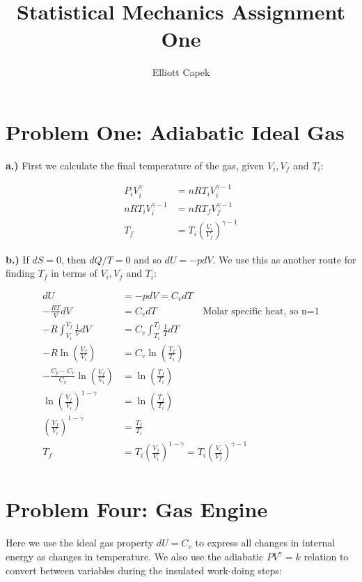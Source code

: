 \documentclass[10pt]{article} %
\title{Statistical Mechanics Assignment One}
\author{Elliott Capek}
\begin{document}
\maketitle{}

\section{Problem One: Adiabatic Ideal Gas}
\textbf{a.)}
First we calculate the final temperature of the gas, given $V_i, V_f$ and $T_i$:

\begin{align*}
  P_iV_i^\gamma &= nRT_iV_i^{\gamma-1}\\
  nRT_iV_i^{\gamma-1} &= nRT_fV_f^{\gamma-1}\\
  T_f &= T_i\left(\frac{V_i}{V_f}\right)^{\gamma-1}
\end{align*}

\textbf{b.)}
If $dS=0$, then $dQ/T=0$ and so $dU = -pdV$. We use this as another route for finding $T_f$ in
terms of $V_i, V_f$ and $T_i$:

\begin{align*}
  dU &= -pdV = C_vdT\\
  -\frac{RT}{V}dV &= C_vdT \hspace{2cm}\mbox{Molar specific heat, so n=1}\\
  -R\int_{V_i}^{V_f}\frac{1}{V}dV &= C_v\int_{T_i}^{T_f}\frac{1}{T}dT\\
  -R\ln\left(\frac{V_f}{V_i}\right) &= C_v\ln\left(\frac{T_f}{T_i}\right)\\
  -\frac{C_p-C_v}{C_v}\ln\left(\frac{V_f}{V_i}\right) &= \ln\left(\frac{T_f}{T_i}\right)\\
  \ln\left(\frac{V_f}{V_i}\right)^{1-\gamma} &= \ln\left(\frac{T_f}{T_i}\right)\\
  \left(\frac{V_f}{V_i}\right)^{1-\gamma} &= \frac{T_f}{T_i}\\
  T_f &= T_i\left(\frac{V_f}{V_i}\right)^{1-\gamma} = T_i\left(\frac{V_i}{V_f}\right)^{\gamma-1}\\
\end{align*}

\section{Problem Four: Gas Engine}
Here we use the ideal gas property $dU = C_v$ to express all changes in internal energy
as changes in temperature. We also use the adiabatic $PV^\gamma = k$ relation to convert
between variables during the insulated work-doing steps:\\
\end{document}
